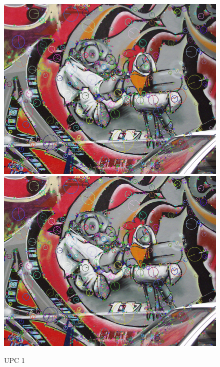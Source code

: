 		\begin{figure}[!htb]
				\includegraphics[width=\linewidth]{images/RobotKp}
				\label{fig:awesome_image1}
			\endminipage\hfill
				\includegraphics[width=\linewidth]{images/RobotKp}
				\label{fig:awesome_image2}
			\endminipage
			\caption{UPC 1}
		\end{figure}

\newpage

